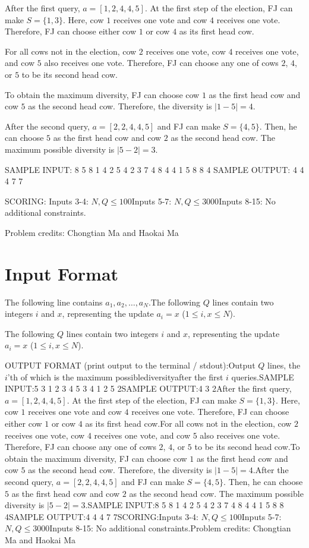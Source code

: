 \documentclass[12pt]{article}
\begin{document}
After the first query, $a = [1, 2, 4, 4, 5]$. At the first step of the election,
FJ can make $S = \{1, 3\}$. Here, cow $1$ receives one vote and cow $4$ receives
one vote.  Therefore, FJ can choose either cow $1$ or cow $4$ as its first head
cow. 

For all cows not in the election, cow $2$ receives one vote, cow $4$ receives
one vote, and cow $5$ also receives one vote. Therefore, FJ can choose any one
of cows $2$, $4$, or $5$ to be its second head cow. 

To obtain the maximum diversity, FJ can choose cow $1$ as the first head cow and
cow $5$ as the second head cow. Therefore, the diversity is $|1-5| = 4$.

After the second query, $a=[2,2,4,4,5]$ and FJ can make $S = \{4, 5\}$. Then, he
can choose $5$ as the first head cow and cow $2$ as the second head cow. The
maximum possible diversity is
$|5 - 2| = 3$.

SAMPLE INPUT:
8 5
8 1 4 2 5 4 2 3
7 4
8 4
4 1
5 8
8 4
SAMPLE OUTPUT: 
4
4
4
7
7

SCORING:
Inputs 3-4: $N, Q \leq 100$Inputs 5-7: $N, Q \leq 3000$Inputs 8-15:  No additional constraints.


Problem credits: Chongtian Ma and Haokai Ma



\section*{Input Format}
The following line contains $a_1, a_2, \ldots, a_N$.The following $Q$ lines contain two integers $i$ and $x$, representing the
update $a_i = x$ ($1 \leq i, x \leq N$).

The following $Q$ lines contain two integers $i$ and $x$, representing the
update $a_i = x$ ($1 \leq i, x \leq N$).

OUTPUT FORMAT (print output to the terminal / stdout):Output $Q$ lines, the $i$'th of which is the maximum possiblediversityafter the first $i$ queries.SAMPLE INPUT:5 3
1 2 3 4 5
3 4
1 2
5 2SAMPLE OUTPUT:4
3
2After the first query, $a = [1, 2, 4, 4, 5]$. At the first step of the election,
FJ can make $S = \{1, 3\}$. Here, cow $1$ receives one vote and cow $4$ receives
one vote.  Therefore, FJ can choose either cow $1$ or cow $4$ as its first head
cow.For all cows not in the election, cow $2$ receives one vote, cow $4$ receives
one vote, and cow $5$ also receives one vote. Therefore, FJ can choose any one
of cows $2$, $4$, or $5$ to be its second head cow.To obtain the maximum diversity, FJ can choose cow $1$ as the first head cow and
cow $5$ as the second head cow. Therefore, the diversity is $|1-5| = 4$.After the second query, $a=[2,2,4,4,5]$ and FJ can make $S = \{4, 5\}$. Then, he
can choose $5$ as the first head cow and cow $2$ as the second head cow. The
maximum possible diversity is
$|5 - 2| = 3$.SAMPLE INPUT:8 5
8 1 4 2 5 4 2 3
7 4
8 4
4 1
5 8
8 4SAMPLE OUTPUT:4
4
4
7
7SCORING:Inputs 3-4: $N, Q \leq 100$Inputs 5-7: $N, Q \leq 3000$Inputs 8-15:  No additional constraints.Problem credits: Chongtian Ma and Haokai Ma
\end{document}
